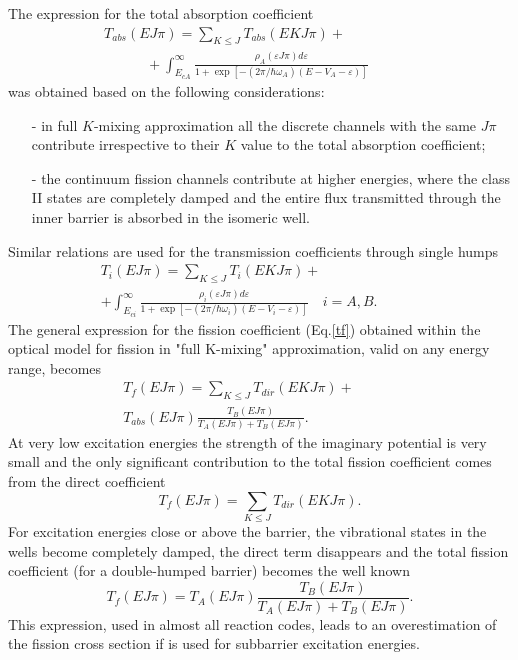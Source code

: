 \documentclass[twocolumn,amsmath,amssymb,10pt,groupedaddress,letter]{revtex4}
\begin{document}
The expression for the total absorption coefficient
%
\begin{eqnarray}
T_{abs}(EJ\pi)=\sum_{K\le J}T_{abs}(EKJ\pi) +\qquad\qquad\quad\nonumber\\
\quad\qquad + \int_{E_{cA}}^{\infty} \frac
{\rho_{A}(\varepsilon J\pi)d\varepsilon} {1+\exp\left[  -(2\pi/\hbar\omega_{A})
(E-V_{A}-\varepsilon)\right]  } \label{tabst}%
\end{eqnarray}
%
was obtained based on the following considerations:
\begin{itemize}
\item [-] in full $K$-mixing approximation all the discrete channels with the same
$J\pi$ contribute irrespective to their $K$ value to the total absorption
coefficient;
\item [-] the continuum fission channels contribute at higher energies,
where the class II states are completely damped and the entire flux
transmitted through the inner barrier is absorbed in the isomeric well.
\end{itemize}
Similar relations are used for the transmission coefficients through single humps
%
\begin{eqnarray}
T_{i}(EJ\pi)=\sum_{K\le J}T_{i}(EKJ\pi) +\qquad\qquad\qquad\quad\nonumber\\
+ \int_{E_{ci}}^{\infty} \frac
{\rho_{i}(\varepsilon J\pi)d\varepsilon} {1+\exp\left[  -({2\pi}/\hbar\omega_{i})
(E-V_{i}-\varepsilon)\right]  } \quad i=A,B.
\label{tfi}%
\end{eqnarray}
%
The general expression for the fission coefficient (Eq.\ref{tf}) obtained within the optical
model for fission in "full K-mixing" approximation, valid on any energy range, becomes
%
\begin{eqnarray}
T_{f}(EJ\pi)=\sum_{K\le J}T_{dir}(EKJ\pi)+\qquad\quad\nonumber\\
T_{abs}(E J \pi)\frac{T_{B}(E J \pi)}{T_{A}(E J \pi)+T_{B}(E J \pi)}.
 \label{tfis}%
\end{eqnarray}
%
At very low excitation energies the strength of the
imaginary potential is very small and the only significant contribution to the total fission
coefficient comes from the direct coefficient
%
\begin{equation}
T_{f}(EJ\pi)=\sum_{K\le J}T_{dir}(EKJ\pi).
\label{tf-zero}%
\end{equation}
%
For excitation energies close or above the barrier,
the vibrational states in the wells become completely damped, the direct term disappears and
the total fission coefficient (for a double-humped barrier) becomes the well known
%
\begin{equation}
T_{f}(E J \pi)=T_{A}(E J \pi)\frac{T_{B}(E J \pi)}{T_{A}(E J \pi)+T_{B}(E J \pi)}.
\label{tf-full}
\end{equation}
%
This expression, used in almost all reaction codes, leads to an overestimation of the
fission cross section if is used for subbarrier excitation energies.
\end{document}
